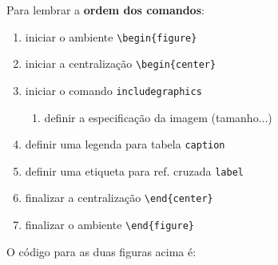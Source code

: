 \documentclass[a4paper,12pt,oneside]{memoir}
\begin{document}
Para lembrar a \textbf{ordem dos comandos}:

\begin{enumerate}
\itemsep0em
    \item iniciar o ambiente \verb|\begin{figure}|
    \item iniciar a centralização \verb|\begin{center}|
    \item iniciar o comando \verb|includegraphics|
    \begin{enumerate}
        \item definir a especificação da imagem (tamanho...)
    \end{enumerate}
    \item definir uma legenda para tabela \verb|caption|
    \item definir uma etiqueta para ref. cruzada \verb|label|
    \item finalizar a centralização \verb|\end{center}|
    \item finalizar o ambiente \verb|\end{figure}|
\end{enumerate}

O código para as duas figuras acima é:
\end{document}
